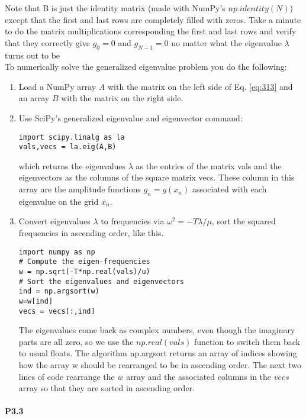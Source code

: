 Note that B is just the identity matrix (made with NumPy\rq s $np.identity(N)$)
except that the first and last rows are completely filled with zeros. Take a minute
to do the matrix multiplications corresponding the first and last rows and verify
that they correctly give $g_0 = 0$ and $g_{N−1} = 0$ no matter what the eigenvalue $\lambda$ turns
out to be \\ 
	To numerically solve the generalized eigenvalue problem you do the following:
	\begin{enumerate}
		\item Load a NumPy array $A$ with the matrix on the left side of Eq. \eqref{eq:313} and an
array $B$ with the matrix on the right side.
\item Use SciPy\rq s generalized eigenvalue and eigenvector command:
\begin{lstlisting}
import scipy.linalg as la
vals,vecs = la.eig(A,B)
\end{lstlisting}
which returns the eigenvalues $\lambda$ as the entries of the matrix vals and the
eigenvectors as the columns of the square matrix vecs. These column
in this array are the amplitude functions $g_n = g(x_n)$ associated with each
eigenvalue on the grid $x_n$.
\item Convert eigenvalues $\lambda$ to frequencies via $\omega^2 = −T \lambda/\mu$, sort the squared
frequencies in ascending order, like this.
\begin{lstlisting}
import numpy as np
# Compute the eigen-frequencies
w = np.sqrt(-T*np.real(vals)/u)
# Sort the eigenvalues and eigenvectors
ind = np.argsort(w)
w=w[ind]
vecs = vecs[:,ind]
\end{lstlisting}
The eigenvalues come back as complex numbers, even though the imaginary parts are all zero, so we use the $np.real(vals)$ function to switch
them back to usual floats. The algorithm np.argsort returns an array of
indices showing how the array w should be rearranged to be in ascending
order. The next two lines of code rearrange the $w$ array and the associated
columns in the $vecs$ array so that they are sorted in ascending order.


	\end{enumerate}
	
\paragraph*{P3.3}

